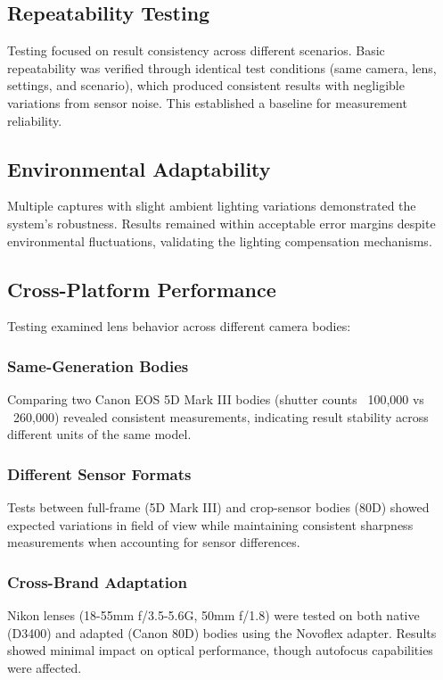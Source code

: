 \subsection{Repeatability Testing}
Testing focused on result consistency across different scenarios. Basic repeatability was verified through identical test conditions (same camera, lens, settings, and scenario), which produced consistent results with negligible variations from sensor noise. This established a baseline for measurement reliability.

\subsection{Environmental Adaptability}
Multiple captures with slight ambient lighting variations demonstrated the system's robustness. Results remained within acceptable error margins despite environmental fluctuations, validating the lighting compensation mechanisms.

\subsection{Cross-Platform Performance}
Testing examined lens behavior across different camera bodies:

\subsubsection{Same-Generation Bodies}
Comparing two Canon EOS 5D Mark III bodies (shutter counts ~100,000 vs ~260,000) revealed consistent measurements, indicating result stability across different units of the same model.

\subsubsection{Different Sensor Formats}
Tests between full-frame (5D Mark III) and crop-sensor bodies (80D) showed expected variations in field of view while maintaining consistent sharpness measurements when accounting for sensor differences.

\subsubsection{Cross-Brand Adaptation}
Nikon lenses (18-55mm f/3.5-5.6G, 50mm f/1.8) were tested on both native (D3400) and adapted (Canon 80D) bodies using the Novoflex adapter. Results showed minimal impact on optical performance, though autofocus capabilities were affected.

